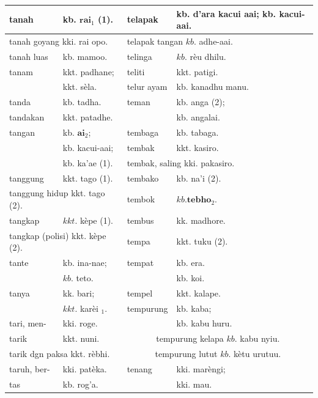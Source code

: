 \documentclass[10pt]{article}
\begin{document}
\begin{center}
\begin{tabular}{|l|l|l|l|}
\hline
tanah & kb. \(\mathbf{r a i}_{1}\) (1). & telapak & kb. d'ara kacui aai; kb. kacui-aai. \\
\hline
\multicolumn{2}{|l|}{tanah goyang kki. rai opo.} & \multicolumn{2}{|l|}{telapak tangan \(k b\). adhe-aai.} \\
\hline
tanah luas & kb. mamoo. & telinga & \(k b\). rèu dhilu. \\
\hline
tanam & kkt. padhane; & teliti & kkt. patigi. \\
\hline
 & kkt. sèla. & telur ayam & kb. kanadhu manu. \\
\hline
tanda & kb. tadha. & teman & kb. anga (2); \\
\hline
tandakan & kkt. patadhe. &  & kb. angalai. \\
\hline
tangan & kb. \(\mathbf{a i}_{2}\); & tembaga & kb. tabaga. \\
\hline
 & kb. kacui-aai; & tembak & kkt. kasiro. \\
\hline
 & kb. ka'ae (1). & \multicolumn{2}{|l|}{tembak, saling kki. pakasiro.} \\
\hline
tanggung & kkt. tago (1). & tembako & kb. na'i (2). \\
\hline
\multicolumn{2}{|l|}{tanggung hidup kkt. tago (2).} & tembok & \(k b . \mathbf{t e b h o}_{2}\). \\
\hline
tangkap & \(k k t\). kèpe (1). & tembus & kk. madhore. \\
\hline
\multicolumn{2}{|l|}{tangkap (polisi) kkt. kèpe (2).} & tempa & kkt. tuku (2). \\
\hline
tante & kb. ina-nae; & tempat & kb. era. \\
\hline
 & \(k b\). teto. &  & kb. koi. \\
\hline
tanya & kk. bari; & tempel & kkt. kalape. \\
\hline
 & \(k k t\). karèi \(_{1}\). & tempurung & kb. kaba; \\
\hline
tari, men- & kki. roge. &  & kb. kabu huru. \\
\hline
tarik & kkt. nuni. & \multicolumn{2}{|c|}{tempurung kelapa \(k b\). kabu nyiu.} \\
\hline
\multicolumn{2}{|l|}{tarik dgn paksa kkt. rèbhi.} & \multicolumn{2}{|c|}{tempurung lutut \(k b\). kètu urutuu.} \\
\hline
taruh, ber- & kki. patèka. & tenang & kki. marèngi; \\
\hline
tas & kb. rog'a. &  & kki. mau. \\

\end{tabular}
\end{center}
\end{document}
